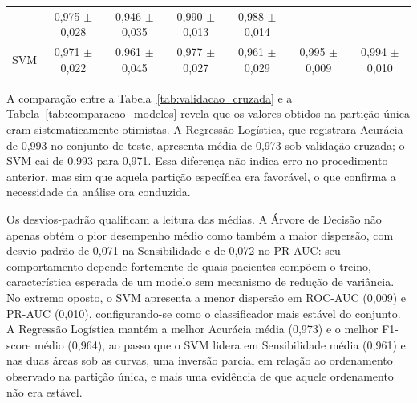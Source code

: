 \documentclass[
    12pt
    ,oneside
    ,a4paper
    ,chapter=TITLE
    ,section=TITLE
    ,sumario=abnt-6027-2012
    ,english,brazil]{abntex2} %
\begin{document}
\begin{table}[htbp]
\begin{tabular}{@{}lcccccc@{}}
                            & \makecell{0,975\\$\pm$ 0,028} & \makecell{0,946\\$\pm$ 0,035}
                            & \makecell{0,990\\$\pm$ 0,013} & \makecell{0,988\\$\pm$ 0,014} \\
        SVM                 & \makecell{0,971\\$\pm$ 0,022} & \makecell{0,961\\$\pm$ 0,045}
                            & \makecell{0,977\\$\pm$ 0,027} & \makecell{0,961\\$\pm$ 0,029}
                            & \makecell{0,995\\$\pm$ 0,009} & \makecell{0,994\\$\pm$ 0,010} \\
        \bottomrule
    \end{tabular}
    \vspace{0.2cm}
    \fonteautor
\end{table}

A comparação entre a Tabela~\ref{tab:validacao_cruzada} e a
Tabela~\ref{tab:comparacao_modelos} revela que os valores obtidos na partição
única eram sistematicamente otimistas. A Regressão Logística, que registrara
Acurácia de 0,993 no conjunto de teste, apresenta média de 0,973 sob validação
cruzada; o SVM cai de 0,993 para 0,971. Essa diferença não indica erro no
procedimento anterior, mas sim que aquela partição específica era favorável, o
que confirma a necessidade da análise ora conduzida.

Os desvios-padrão qualificam a leitura das médias. A Árvore de Decisão não
apenas obtém o pior desempenho médio como também a maior dispersão, com
desvio-padrão de 0,071 na Sensibilidade e de 0,072 no PR-AUC: seu comportamento
depende fortemente de quais pacientes compõem o treino, característica esperada
de um modelo sem mecanismo de redução de variância. No extremo oposto, o SVM
apresenta a menor dispersão em ROC-AUC (0,009) e PR-AUC (0,010), configurando-se
como o classificador mais estável do conjunto. A Regressão Logística mantém a
melhor Acurácia média (0,973) e o melhor F1-score médio (0,964), ao passo que o
SVM lidera em Sensibilidade média (0,961) e nas duas áreas sob as curvas, uma
inversão parcial em relação ao ordenamento observado na partição única, e mais
uma evidência de que aquele ordenamento não era estável.
\end{document}
